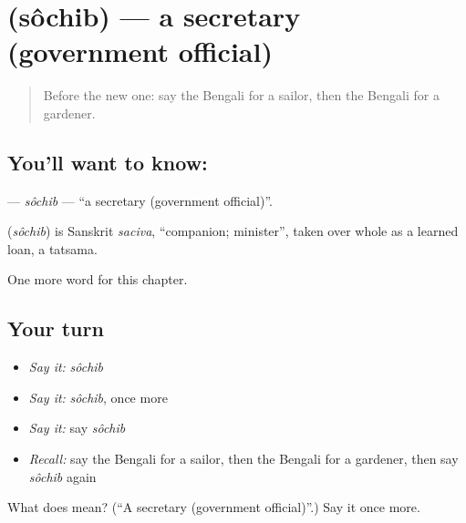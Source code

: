 \section[\texorpdfstring{\bn{সচিব} (sôchib)}{সচিব (sôchib)}]{ (sôchib) — a secretary (government official)}

\label{lesson:BN-C208-sochib}



\begin{quote}
Before the new one: say the Bengali for a sailor, then the Bengali for a gardener.
\end{quote}

\subsection*{You'll want to know: }
\textbf{} — \emph{sôchib} — \textquotedblleft{}a secretary (government official)\textquotedblright{}.

\begin{cousinweb}
\textbf{} (\emph{sôchib}) is Sanskrit \emph{saciva}, \textquotedblleft{}companion; minister\textquotedblright{}, taken over whole as a learned loan, a tatsama.
\end{cousinweb}

\begin{grammarlens}[title={What you've built}]
One more word for this chapter.
\end{grammarlens}

\subsection*{Your turn}
\begin{itemize}
\raggedright
  \item \emph{Say it:} \emph{sôchib}
  \item \emph{Say it:} \emph{sôchib}, once more
  \item \emph{Say it:} say \emph{sôchib}
  \item \emph{Recall:} say the Bengali for a sailor, then the Bengali for a gardener, then say \emph{sôchib} again
\end{itemize}

\begin{tcolorbox}[breakable,colback=teal!4,colframe=teal!35!black,title={Before you move on}]
What does  mean? (\textquotedblleft{}A secretary (government official)\textquotedblright{}.) Say it once more.
\end{tcolorbox}
